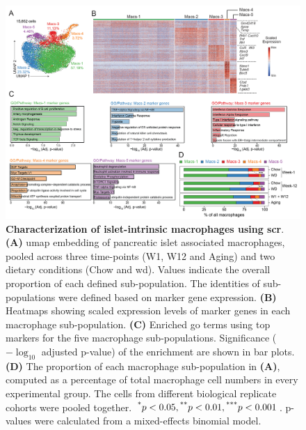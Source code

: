 \begin{figure}[t!]
\centering
\includegraphics[width=\linewidth]{Chapter4/Fig/F2-5-01.png}
\caption[Characterization of islet-intrinsic macrophages using ]{\textbf{Characterization of islet-intrinsic macrophages using \gls{scr}}. \textbf{(A)} \gls{umap} embedding of pancreatic islet associated macrophages, pooled across three time-points (W1, W12 and Aging) and two dietary conditions (Chow and \gls{wd}). Values indicate the overall proportion of each defined sub-population. The identities of sub-populations were defined based on marker gene expression. \textbf{(B)} Heatmaps showing scaled expression levels of marker genes in each macrophage sub-population. \textbf{(C)} Enriched \gls{go} terms using top markers for the five macrophage sub-populations. Significance ($-\log_{10}$ adjusted p-value) of the enrichment are shown in bar plots. \textbf{(D)} The proportion of each macrophage sub-population in \textbf{(A)}, computed as a percentage of total macrophage cell numbers in every experimental group. The cells from different biological replicate cohorts were pooled together. $\textsuperscript{*} p < 0.05, \textsuperscript{**} p < 0.01, \textsuperscript{***} p < 0.001$. p-values were calculated from a mixed-effects binomial model. }
\label{fig:chp2_scrna_macrophages}
\end{figure}


